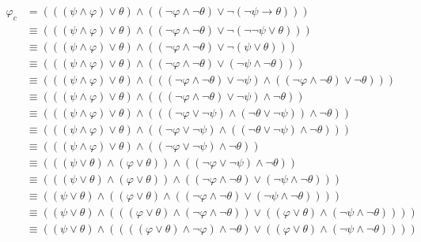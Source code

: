 \documentclass[12pt,a4paper]{scrartcl}
\begin{document}
\setcounter{equation}{-1}
\begin{align}
  \varphi_c 
    & = (((\psi \wedge \varphi) \vee \theta) \wedge ((\neg \varphi \wedge \neg \theta) \vee \neg(\neg \psi \rightarrow \theta))) \\
    & \equiv (((\psi \wedge \varphi) \vee \theta) \wedge ((\neg \varphi \wedge \neg \theta) \vee \neg(\neg \neg \psi \vee \theta))) \\
    & \equiv (((\psi \wedge \varphi) \vee \theta) \wedge ((\neg \varphi \wedge \neg \theta) \vee \neg(\psi \vee \theta))) \\
    & \equiv (((\psi \wedge \varphi) \vee \theta) \wedge ((\neg \varphi \wedge \neg \theta) \vee (\neg \psi \wedge \neg \theta))) \\
    & \equiv (((\psi \wedge \varphi) \vee \theta) \wedge (((\neg \varphi \wedge \neg \theta) \vee \neg \psi) \wedge ((\neg \varphi \wedge \neg \theta) \vee \neg \theta))) \\
    & \equiv (((\psi \wedge \varphi) \vee \theta) \wedge (((\neg \varphi \wedge \neg \theta) \vee \neg \psi) \wedge \neg \theta)) \\
    & \equiv (((\psi \wedge \varphi) \vee \theta) \wedge (((\neg \varphi \vee \neg \psi) \wedge (\neg \theta \vee \neg \psi)) \wedge \neg \theta)) \\
    & \equiv (((\psi \wedge \varphi) \vee \theta) \wedge ((\neg \varphi \vee \neg \psi) \wedge ((\neg \theta \vee \neg \psi) \wedge \neg \theta))) \\
    & \equiv (((\psi \wedge \varphi) \vee \theta) \wedge ((\neg \varphi \vee \neg \psi) \wedge \neg \theta)) \\
    & \equiv (((\psi \vee \theta) \wedge (\varphi \vee \theta)) \wedge ((\neg \varphi \vee \neg \psi) \wedge \neg \theta)) \\
    & \equiv (((\psi \vee \theta) \wedge (\varphi \vee \theta)) \wedge ((\neg \varphi \wedge \neg \theta) \vee (\neg \psi \wedge \neg \theta))) \\
    & \equiv ((\psi \vee \theta) \wedge ((\varphi \vee \theta) \wedge ((\neg \varphi \wedge \neg \theta) \vee (\neg \psi \wedge \neg \theta)))) \\
    & \equiv ((\psi \vee \theta) \wedge (((\varphi \vee \theta) \wedge (\neg \varphi \wedge \neg \theta)) \vee ((\varphi \vee \theta) \wedge (\neg \psi \wedge \neg \theta)))) \\
    & \equiv ((\psi \vee \theta) \wedge ((((\varphi \vee \theta) \wedge \neg \varphi) \wedge \neg \theta) \vee ((\varphi \vee \theta) \wedge (\neg \psi \wedge \neg \theta)))) \\

\end{align}
\end{document}
